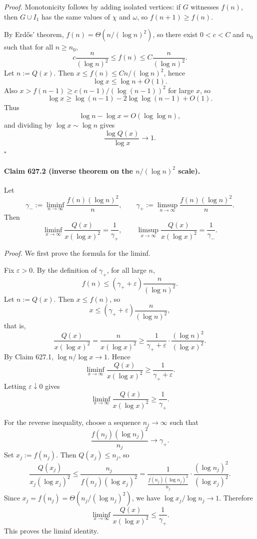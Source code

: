 \emph{Proof.}
Monotonicity follows by adding isolated vertices: if \(G\) witnesses \(f(n)\), then \(G\cup I_1\) has
the same values of \(\chi\) and \(\omega\), so \(f(n+1)\ge f(n)\).

By Erd\H{o}s' theorem, \(f(n)=\Theta(n/(\log n)^2)\), so there exist \(0<c<C\) and \(n_0\) such that for all \(n\ge n_0\),
\[
c\frac{n}{(\log n)^2}\le f(n)\le C\frac{n}{(\log n)^2}.
\]
Let \(n:=Q(x)\). Then \(x\le f(n)\le Cn/(\log n)^2\), hence
\[
\log x\le \log n + O(1).
\]
Also \(x>f(n-1)\ge c(n-1)/(\log(n-1))^2\) for large \(x\), so
\[
\log x\ge \log(n-1)-2\log\log(n-1)+O(1).
\]
Thus
\[
\log n-\log x=O(\log\log n),
\]
and dividing by \(\log x\sim \log n\) gives
\[
\frac{\log Q(x)}{\log x}\to 1.
\]
\(\square\)

\paragraph{Claim 627.2 (inverse theorem on the \(n/(\log n)^2\) scale).}
Let
\[
\gamma_-:=\liminf_{n\to\infty}\frac{f(n)(\log n)^2}{n},
\qquad
\gamma_+:=\limsup_{n\to\infty}\frac{f(n)(\log n)^2}{n}.
\]
Then
\[
\liminf_{x\to\infty}\frac{Q(x)}{x(\log x)^2}=\frac{1}{\gamma_+},
\qquad
\limsup_{x\to\infty}\frac{Q(x)}{x(\log x)^2}=\frac{1}{\gamma_-}.
\]

\emph{Proof.}
We first prove the formula for the liminf.

Fix \(\varepsilon>0\). By the definition of \(\gamma_+\), for all large \(n\),
\[
f(n)\le (\gamma_++\varepsilon)\frac{n}{(\log n)^2}.
\]
Let \(n:=Q(x)\). Then \(x\le f(n)\), so
\[
x\le (\gamma_++\varepsilon)\frac{n}{(\log n)^2},
\]
that is,
\[
\frac{Q(x)}{x(\log x)^2}
=
\frac{n}{x(\log x)^2}
\ge
\frac{1}{\gamma_++\varepsilon}\cdot \frac{(\log n)^2}{(\log x)^2}.
\]
By Claim 627.1, \(\log n/\log x\to 1\). Hence
\[
\liminf_{x\to\infty}\frac{Q(x)}{x(\log x)^2}\ge \frac{1}{\gamma_++\varepsilon}.
\]
Letting \(\varepsilon\downarrow 0\) gives
\[
\liminf_{x\to\infty}\frac{Q(x)}{x(\log x)^2}\ge \frac{1}{\gamma_+}.
\]

For the reverse inequality, choose a sequence \(n_j\to\infty\) such that
\[
\frac{f(n_j)(\log n_j)^2}{n_j}\to \gamma_+.
\]
Set \(x_j:=f(n_j)\). Then \(Q(x_j)\le n_j\), so
\[
\frac{Q(x_j)}{x_j(\log x_j)^2}
\le
\frac{n_j}{f(n_j)(\log x_j)^2}
=
\frac{1}{\frac{f(n_j)(\log n_j)^2}{n_j}}\cdot \frac{(\log n_j)^2}{(\log x_j)^2}.
\]
Since \(x_j=f(n_j)=\Theta(n_j/(\log n_j)^2)\), we have \(\log x_j/\log n_j\to 1\). Therefore
\[
\liminf_{x\to\infty}\frac{Q(x)}{x(\log x)^2}\le \frac{1}{\gamma_+}.
\]
This proves the liminf identity.

